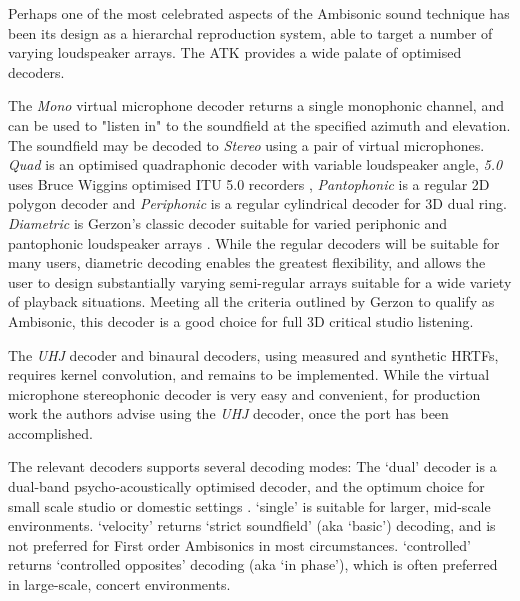 \documentclass{article}
\begin{document}
Perhaps one of the most celebrated aspects of the Ambisonic sound technique has been its design as a hierarchal reproduction system, able to target a number of varying loudspeaker arrays.
The ATK provides a wide palate of optimised decoders.

The \emph{Mono} virtual microphone decoder returns a single monophonic channel, and can be used to "listen in" to the soundfield at the specified azimuth and elevation.
The soundfield may be decoded to \emph{Stereo} using a pair of virtual microphones.
\emph{Quad} is an optimised quadraphonic decoder with variable loudspeaker angle, \emph{5.0} uses Bruce Wiggins optimised ITU 5.0 recorders \cite{wiggins:2003optimised}, \emph{Pantophonic} is a regular 2D polygon decoder and \emph{Periphonic} is a regular cylindrical decoder for 3D dual ring.
\emph{Diametric} is Gerzon's classic decoder suitable for varied periphonic and pantophonic loudspeaker arrays \cite{gerzon:1980sphere}.
While the regular decoders will be suitable for many users, diametric decoding enables the greatest flexibility, and allows the user to design substantially varying semi-regular arrays suitable for a wide variety of playback situations.
Meeting all the criteria outlined by Gerzon to qualify as Ambisonic, this decoder is a good choice for full 3D critical studio listening.

The \emph{UHJ} decoder and binaural decoders, using measured and synthetic HRTFs, requires kernel convolution, and remains to be implemented.
While the virtual microphone stereophonic decoder is very easy and convenient, for production work the authors advise using the \emph{UHJ} decoder, once the port has been accomplished.

The relevant decoders supports several decoding modes: 
The `dual' decoder is a dual-band psycho-acoustically optimised decoder, and the optimum choice for small scale studio or domestic settings \cite{heller:2008isAmbisonic}.
`single' is suitable for larger, mid-scale environments.
`velocity' returns `strict soundfield' (aka `basic') decoding, and is not preferred for First order Ambisonics in most circumstances.
`controlled' returns `controlled opposites' decoding (aka `in phase'), which is often preferred in large-scale, concert environments.



\end{document}
